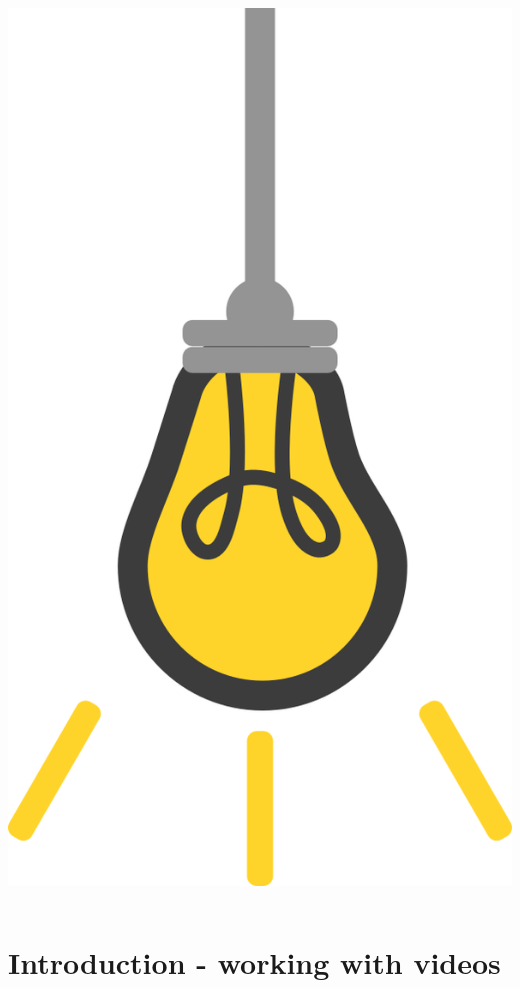 \documentclass[9pt, aspectratio=169]{beamer}
\begin{document}
\begin{frame}
\begin{columns}
\begin{column}{0.2\textwidth}
            \includegraphics[angle=-30, origin=tr, width=1.5\textwidth]{lightbulb.png}
        \end{column}
    \end{columns}
\end{frame}

\section{Introduction - working with videos}
\end{document}

